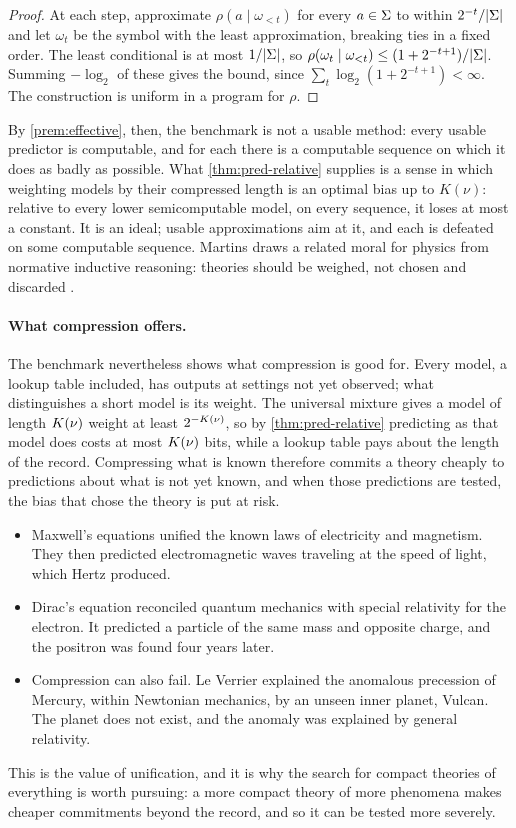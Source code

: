 \begin{proof}
At each step, approximate $\rho(a\mid\omega_{<t})$ for every $a\in\Sigma$ to within
$2^{-t}/|\Sigma|$ and let $\omega_t$ be the symbol with the least approximation, breaking
ties in a fixed order. The least conditional is at most $1/|\Sigma|$, so
$\rho(\omega_t\mid\omega_{<t})\le(1+2^{-t+1})/|\Sigma|$. Summing $-\log_2$ of these gives
the bound, since $\sum_t\log_2(1+2^{-t+1})<\infty$. The construction is uniform in a
program for $\rho$.
\end{proof}

By \cref{prem:effective}, then, the benchmark is not a usable method: every usable
predictor is computable, and for each there is a computable sequence on which it does as
badly as possible. What \cref{thm:pred-relative} supplies is a sense in which weighting
models by their compressed length is an optimal bias up to $K(\nu)$: relative to every lower
semicomputable model, on every sequence, it loses at most a constant. It is an ideal;
usable approximations aim at it, and each is defeated on some computable sequence. Martins draws a related moral for physics from normative
inductive reasoning: theories should be weighed, not chosen and discarded
\citep{martins2017}.

\paragraph{What compression offers.}
The benchmark nevertheless shows what compression is good for. Every model, a lookup
table included, has outputs at settings not yet observed; what distinguishes a short
model is its weight. The universal mixture gives a model of length $K(\nu)$ weight at
least $2^{-K(\nu)}$, so by \cref{thm:pred-relative} predicting as that model does costs
at most $K(\nu)$ bits, while a lookup table pays about the length of the record.
Compressing what is known therefore commits a theory cheaply to predictions about what
is not yet known, and when those predictions are tested, the bias that chose the theory
is put at risk.
\begin{itemize}
  \item Maxwell's equations unified the known laws of electricity and magnetism. They
        then predicted electromagnetic waves traveling at the speed of light, which
        Hertz produced.
  \item Dirac's equation reconciled quantum mechanics with special relativity for the
        electron. It predicted a particle of the same mass and opposite charge, and the
        positron was found four years later.
  \item Compression can also fail. Le Verrier explained the anomalous precession of
        Mercury, within Newtonian mechanics, by an unseen inner planet, Vulcan. The
        planet does not exist, and the anomaly was explained by general relativity.
\end{itemize}
This is the value of unification, and it is why the search for compact theories of
everything is worth pursuing: a more compact theory of more phenomena makes cheaper
commitments beyond the record, and so it can be tested more severely.

